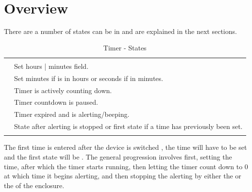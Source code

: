 \section{Overview}

There are a number of states  can be in and are explained in the next
sections.

\begin{table}[H]
  \centering
  \begin{tabu} { X[1,c,m] | X[3,l,m] }
    \thrule
     &  \\ \mrule

     & Set hours | minutes field. \\ 
     & Set minutes if  is in hours or
      seconds if in minutes.  \\ 
     & Timer is actively counting down.  \\ 
     & Timer countdown is paused.  \\ 
     & Timer expired and is alerting\slash beeping.  \\ 
     & State after alerting is stopped or first state if
        a time has previously been set. \\
    \bhrule
  \end{tabu}
  \caption{Timer - States}
\end{table}

The first time  is entered after the device is switched , the
time will have to be set and the first state will be .  The general
progression involves first, setting the time, after which the timer starts
running, then letting the timer count down to \num{0} at which time it begins
alerting, and then stopping the alerting by either  the
 or  the  of the enclosure.

\tabcolsep=10pt
\tabcolsep=12pt

